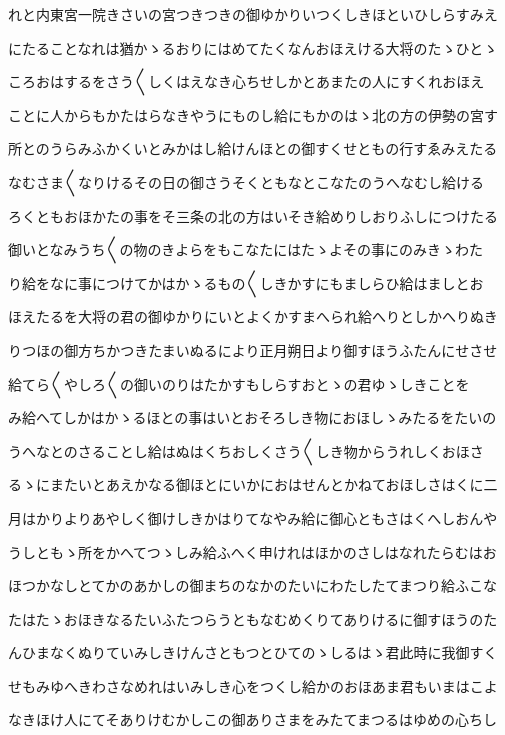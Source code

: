 \documentclass[a4paper,11pt,landscape]{ltjtarticle}
\begin{document}
れと内東宮一院きさいの宮つきつきの御ゆかりいつくしきほといひしらすみえ
\par\medskip
にたることなれは猶かゝるおりにはめてたくなんおほえける大将のたゝひとゝ
\par\medskip
ころおはするをさう〱しくはえなき心ちせしかとあまたの人にすくれおほえ
\par\medskip
ことに人からもかたはらなきやうにものし給にもかのはゝ北の方の伊勢の宮す
\par\medskip
所とのうらみふかくいとみかはし給けんほとの御すくせともの行すゑみえたる
\par\medskip
なむさま〱なりけるその日の御さうそくともなとこなたのうへなむし給ける
\par\medskip
ろくともおほかたの事をそ三条の北の方はいそき給めりしおりふしにつけたる
\par\medskip
御いとなみうち〱の物のきよらをもこなたにはたゝよその事にのみきゝわた
\par\medskip
り給をなに事につけてかはかゝるもの〱しきかすにもましらひ給はましとお
\par\medskip
ほえたるを大将の君の御ゆかりにいとよくかすまへられ給へりとしかへりぬき
\par\medskip
りつほの御方ちかつきたまいぬるにより正月朔日より御すほうふたんにせさせ
\par\medskip
給てら〱やしろ〱の御いのりはたかすもしらすおとゝの君ゆゝしきことを
\par\medskip
み給へてしかはかゝるほとの事はいとおそろしき物におほしゝみたるをたいの
\par\medskip
うへなとのさることし給はぬはくちおしくさう〱しき物からうれしくおほさ
\par\medskip
るゝにまたいとあえかなる御ほとにいかにおはせんとかねておほしさはくに二
\par\medskip
月はかりよりあやしく御けしきかはりてなやみ給に御心ともさはくへしおんや
\par\medskip
うしともゝ所をかへてつゝしみ給ふへく申けれはほかのさしはなれたらむはお
\par\medskip
ほつかなしとてかのあかしの御まちのなかのたいにわたしたてまつり給ふこな
\par\medskip
たはたゝおほきなるたいふたつらうともなむめくりてありけるに御すほうのた
\par\medskip
んひまなくぬりていみしきけんさともつとひてのゝしるはゝ君此時に我御すく
\par\medskip
せもみゆへきわさなめれはいみしき心をつくし給かのおほあま君もいまはこよ
\par\medskip
なきほけ人にてそありけむかしこの御ありさまをみたてまつるはゆめの心ちし
\end{document}

